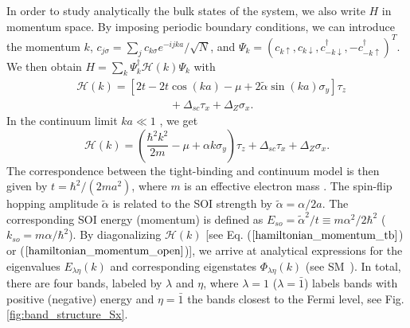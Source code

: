 \documentclass[prl,twocolumn,showpacs,floatfix,amsbsy,amsbsy,superscriptaddress]{revtex4-1}
\begin{document}
In order to study analytically the bulk states of the system,  we also write ${H}$ in  momentum space.  By imposing periodic boundary conditions, we can introduce the momentum $k$,  ${c}_{j \sigma}=\sum_j {c}_{k \sigma} e^{-ijka}/\sqrt{N}$, and ${\Psi}_k=({c}_{k \uparrow}, {c}_{k \downarrow}, {c}_{-k \downarrow}^{\dag}, -{c}_{-k \uparrow}^{\dag})^T$. We then obtain  ${H}=\sum_k{\Psi}_k^\dag{\mathcal H}(k){\Psi}_k$ with
\begin{align}
 &  {\mathcal H}(k)=\left[2t-2t\cos(ka)-\mu+2\tilde{\alpha}\sin(ka)\sigma_y\right]	\tau_z \nonumber\\
    &\hspace{100pt}+\Delta_{sc}\tau_x+\Delta_Z\sigma_x. \label{hamiltonian_momentum_tb}
\end{align} 
In the continuum limit $ka\ll 1$ \cite{composite_majorana},
we get 
\begin{equation}\label{hamiltonian_momentum_open}
    {\mathcal H}(k)=\left(\frac{\hbar^2k^2}{2m} -\mu+\alpha k \sigma_y\right)\tau_z+\Delta_{sc}\tau_x+\Delta_{Z}\sigma_x.
\end{equation}
The correspondence between the tight-binding and continuum model is then given by $t=\hbar^2/(2ma^2)$, where $m$ is an effective electron mass \cite{Diego}. The spin-flip hopping amplitude  $\tilde{\alpha}$ is related to the SOI strength by $\tilde{\alpha}=\alpha/2a$. The corresponding SOI energy (momentum) is defined as $E_{so}=\tilde{\alpha}^2/t\equiv m \alpha^2/2 \hbar^2$  ($k_{so}=m\alpha/\hbar^2$).
By diagonalizing $ {\mathcal H}(k)$ [see Eq.  ($\ref{hamiltonian_momentum_tb}$) or ($\ref{hamiltonian_momentum_open}$)], we arrive at analytical expressions for the eigenvalues  $E_{\lambda\eta}(k)$ and corresponding eigenstates $\Phi_{\lambda\eta}(k)$ (see SM~\cite{SM}).
In total, there are four bands, labeled by  $\lambda$ and $\eta$, where $\lambda=1$ ($\lambda=\bar 1$) labels bands with positive (negative) energy and $\eta=\bar 1$ the bands closest to the Fermi level,  see Fig. \ref{fig:band_structure_Sx}. 
\end{document}
